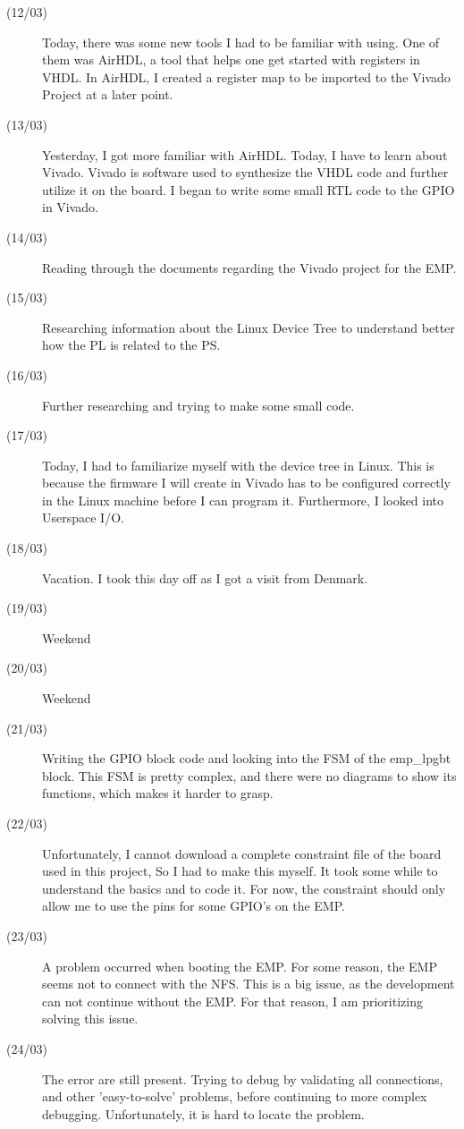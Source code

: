 \begin{description}
\item[(12/03)] Today, there was some new tools I had to be familiar with using. One of them was AirHDL, a tool that helps one get started with registers in VHDL. In AirHDL, I created a register map to be imported to the Vivado Project at a later point.
\item[(13/03)] Yesterday, I got more familiar with AirHDL. Today, I have to learn about Vivado. Vivado is software used to synthesize the VHDL code and further utilize it on the board. I began to write some small RTL code to the GPIO in Vivado.
\item[(14/03)] Reading through the documents regarding the Vivado project for the EMP.
\item[(15/03)] Researching information about the Linux Device Tree to understand better how the PL is related to the PS.
\item[(16/03)] Further researching and trying to make some small code. 
\item[(17/03)] Today, I had to familiarize myself with the device tree in Linux. This is because the firmware I will create in Vivado has to be configured correctly in the Linux machine before I can program it. Furthermore, I looked into Userspace I/O.  
\item[(18/03)] Vacation. I took this day off as I got a visit from Denmark.
\item[(19/03)] Weekend
\item[(20/03)] Weekend 
\item[(21/03)] Writing the GPIO block code and looking into the FSM of the emp\_lpgbt block. This FSM is pretty complex, and there were no diagrams to show its functions, which makes it harder to grasp. 
\item[(22/03)] Unfortunately, I cannot download a complete constraint file of the board used in this project, So I had to make this myself. It took some while to understand the basics and to code it. For now, the constraint should only allow me to use the pins for some GPIO's on the EMP.
\item[(23/03)] A problem occurred when booting the EMP. For some reason, the EMP seems not to connect with the NFS. This is a big issue, as the development can not continue without the EMP. For that reason, I am prioritizing solving this issue.
\item[(24/03)] The error are still present. Trying to debug by validating all connections, and other 'easy-to-solve' problems, before continuing to more complex debugging. Unfortunately, it is hard to locate the problem.

\end{description}
